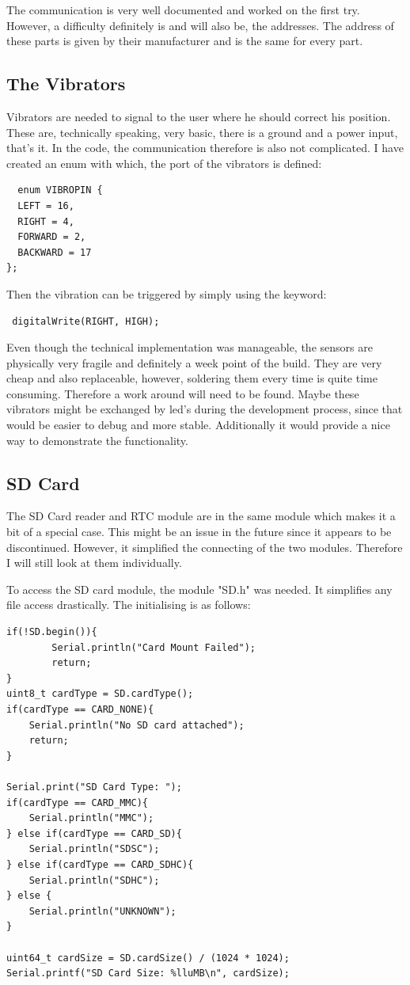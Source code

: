 The communication is very well documented \cite{ArduinoW76:online} and worked on the first try. However, a difficulty definitely is and will also be, the addresses. The address of these parts is given by their manufacturer and is the same for every part. 

\subsection{The Vibrators}

Vibrators are needed to signal to the user where he should correct his position. These are, technically speaking, very basic, there is a ground and a power input, that's it. In the code, the communication therefore is also not complicated. 
I have created an enum with which, the port of the vibrators is defined:
\begin{lstlisting}
  enum VIBROPIN {
  LEFT = 16,
  RIGHT = 4,
  FORWARD = 2,
  BACKWARD = 17
};
\end{lstlisting}
Then the vibration can be triggered by simply using the keyword:
\begin{lstlisting}
 digitalWrite(RIGHT, HIGH);
\end{lstlisting}

Even though the technical implementation was manageable, the sensors are physically very fragile and definitely a week point of the build. They are very cheap and also replaceable, however, soldering them every time is quite time consuming. Therefore a work around will need to be found. Maybe these vibrators might be exchanged by led's during the development process, since that would be easier to debug and more stable. Additionally it would provide a nice way to demonstrate the functionality. 


\subsection{SD Card}

The SD Card reader and RTC module are in the same module which makes it a bit of a special case. This might be an issue in the future since it appears to be discontinued. However, it simplified the connecting of the two modules. Therefore I will still look at them individually. 

To access the SD card module, the module "SD.h" was needed. It simplifies any file access drastically. The initialising is as follows:

\begin{lstlisting}
if(!SD.begin()){
        Serial.println("Card Mount Failed");
        return;
}
uint8_t cardType = SD.cardType();
if(cardType == CARD_NONE){
    Serial.println("No SD card attached");
    return;
}

Serial.print("SD Card Type: ");
if(cardType == CARD_MMC){
    Serial.println("MMC");
} else if(cardType == CARD_SD){
    Serial.println("SDSC");
} else if(cardType == CARD_SDHC){
    Serial.println("SDHC");
} else {
    Serial.println("UNKNOWN");
}

uint64_t cardSize = SD.cardSize() / (1024 * 1024);
Serial.printf("SD Card Size: %lluMB\n", cardSize);
\end{lstlisting}
\cite{BlogofWe42:online}


